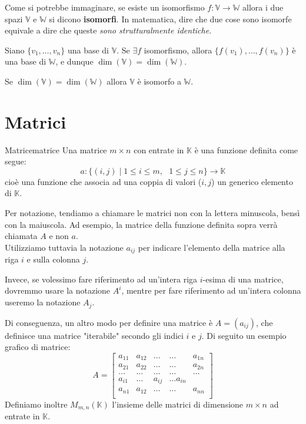 \documentclass[12pt]{report}
\newcommand{\whitespace}{\text{ }}
\newcommand{\K}{\mathbb{K}}
\newcommand{\V}{\mathbb{V}}
\newcommand{\W}{\mathbb{W}}
\newcommand{\vectors}[1]{#1_1, \dots, #1_n}
\begin{document}
	Come si potrebbe immaginare, se esiste un isomorfismo $f: \V \to \W$ allora i due spazi $\V \text{ e } \W$ si dicono \textbf{isomorfi}.
	In matematica, dire che due cose sono isomorfe equivale a dire che queste \textit{sono strutturalmente identiche}.
	
	\begin{osservazione}{}{}
		Siano $\{\vectors{v}\}$ una base di $\V$. Se $\exists f$ isomorfismo, allora $\{f(v_1), \dots, f(v_n)\}$ è una base di $\W$, e dunque $\dim(\V) = \dim(\W)$.
	\end{osservazione}
	
	\begin{osservazione}{}{}
		Se $\dim(\V) = \dim(\W)$ allora $\V$ è isomorfo a $\W$.
	\end{osservazione}
	
	\section{Matrici}
	\begin{definizione}{Matrice}{matrice}
		Una matrice $m \times n$ con entrate in $\K$ è una funzione definita come segue:
		\[
			a : \{(i, j) \mid 1 \leq i \leq m, \whitespace 1 \leq j \leq n\} \to \K
		\]
		cioè una funzione che associa ad una coppia di valori ($i, j$) un generico elemento di $\K$.
	\end{definizione}
	
	Per notazione, tendiamo a chiamare le matrici non con la lettera minuscola, bensì con la maiuscola. Ad esempio, la matrice della funzione definita sopra verrà chiamata $A$ e non $a$.\\
	Utilizziamo tuttavia la notazione $a_{ij}$ per indicare l'elemento della matrice alla riga $i$ e sulla colonna $j$.
	
	Invece, se volessimo fare riferimento ad un'intera riga $i$-esima di una matrice, dovremmo usare la notazione $A^i$, mentre per fare riferimento ad un'intera colonna useremo la notazione $A_j$.
	
	Di conseguenza, un altro modo per definire una matrice è $A = (a_{ij})$, che definisce una matrice "iterabile" secondo gli indici $i$ e $j$.
	Di seguito un esempio grafico di matrice:
	\[
		A = \begin{bmatrix}
			a_{11} & a_{12} & \dots & \dots & a_{1n}\\
			a_{21} & a_{22} & \dots & \dots & a_{2n}\\
			\dots & \dots & \dots & \dots &\dots \\
			a_{i1} & \dots & a_{ij} & \dots a_{in}\\
			a_{n1} & a_{12} & \dots & \dots & a_{nn}\\
		\end{bmatrix}
	\]
	Definiamo inoltre $M_{m, n}(\K)$ l'insieme delle matrici di dimensione $m \times n$ ad entrate in $\K$.
	
\end{document}
